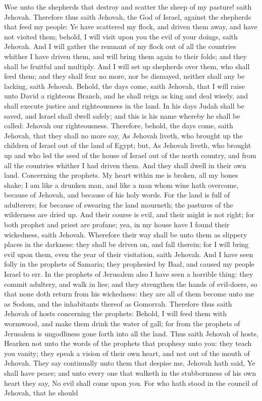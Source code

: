 Woe unto the shepherds that destroy and scatter the sheep of my pasture! saith Jehovah. Therefore thus saith Jehovah, the God of Israel, against the shepherds that feed my people: Ye have scattered my flock, and driven them away, and have not visited them; behold, I will visit upon you the evil of your doings, saith Jehovah. And I will gather the remnant of my flock out of all the countries whither I have driven them, and will bring them again to their folds; and they shall be fruitful and multiply. And I will set up shepherds over them, who shall feed them; and they shall fear no more, nor be dismayed, neither shall any be lacking, saith Jehovah.  Behold, the days come, saith Jehovah, that I will raise unto David a righteous Branch, and he shall reign as king and deal wisely, and shall execute justice and righteousness in the land. In his days Judah shall be saved, and Israel shall dwell safely; and this is his name whereby he shall be called: Jehovah our righteousness. Therefore, behold, the days come, saith Jehovah, that they shall no more say, As Jehovah liveth, who brought up the children of Israel out of the land of Egypt; but, As Jehovah liveth, who brought up and who led the seed of the house of Israel out of the north country, and from all the countries whither I had driven them. And they shall dwell in their own land.  Concerning the prophets. My heart within me is broken, all my bones shake; I am like a drunken man, and like a man whom wine hath overcome, because of Jehovah, and because of his holy words. For the land is full of adulterers; for because of swearing the land mourneth; the pastures of the wilderness are dried up. And their course is evil, and their might is not right; for both prophet and priest are profane; yea, in my house have I found their wickedness, saith Jehovah. Wherefore their way shall be unto them as slippery places in the darkness: they shall be driven on, and fall therein; for I will bring evil upon them, even the year of their visitation, saith Jehovah.  And I have seen folly in the prophets of Samaria; they prophesied by Baal, and caused my people Israel to err. In the prophets of Jerusalem also I have seen a horrible thing: they commit adultery, and walk in lies; and they strengthen the hands of evil-doers, so that none doth return from his wickedness: they are all of them become unto me as Sodom, and the inhabitants thereof as Gomorrah. Therefore thus saith Jehovah of hosts concerning the prophets: Behold, I will feed them with wormwood, and make them drink the water of gall; for from the prophets of Jerusalem is ungodliness gone forth into all the land.  Thus saith Jehovah of hosts, Hearken not unto the words of the prophets that prophesy unto you: they teach you vanity; they speak a vision of their own heart, and not out of the mouth of Jehovah. They say continually unto them that despise me, Jehovah hath said, Ye shall have peace; and unto every one that walketh in the stubbornness of his own heart they say, No evil shall come upon you. For who hath stood in the council of Jehovah, that he should 